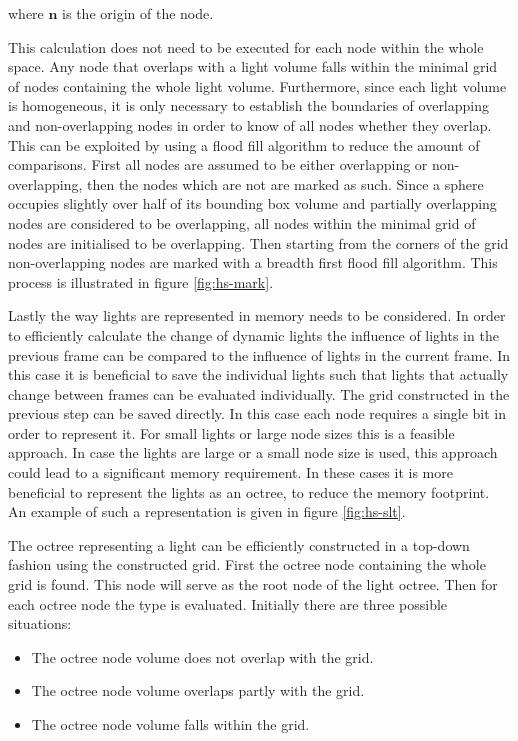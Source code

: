 \noindent where $\mathbf{n}$ is the origin of the node.

This calculation does not need to be executed for each node within the whole space. Any node that
overlaps with a light volume falls within the minimal grid of nodes containing the whole light
volume. Furthermore, since each light volume is homogeneous, it is only necessary to establish the boundaries
of overlapping and non-overlapping nodes in order to know of all nodes whether they overlap.
This can be exploited by using a flood fill algorithm to reduce the amount of comparisons.
First all nodes are assumed to be either overlapping or non-overlapping, then the nodes which
are not are marked as such. Since a sphere occupies slightly over half of its bounding box
volume and partially overlapping nodes are considered to be overlapping, all nodes within
the minimal grid of nodes are initialised to be overlapping. Then starting from the corners
of the grid non-overlapping nodes are marked with a breadth first flood fill algorithm.
This process is illustrated in figure \ref{fig:hs-mark}.



Lastly the way lights are represented in memory needs to be considered. In order to efficiently
calculate the change of dynamic lights the influence of lights in the previous frame can be compared
to the influence of lights in the current frame. In this case it is beneficial to save the
individual lights such that lights that actually change between frames can be evaluated
individually. The grid constructed in the previous step can be saved directly. In this case
each node requires a single bit in order to represent it. For small lights or large node sizes
this is a feasible approach. In case the lights are large or a small node size is used, this
approach could lead to a significant memory requirement. In these cases it is more beneficial
to represent the lights as an octree, to reduce the memory footprint. An example of such a
representation is given in figure \ref{fig:hs-slt}.

The octree representing a light can be efficiently constructed in a top-down fashion using the
constructed grid. First the octree node containing the whole grid is found. This node will
serve as the root node of the light octree. Then for each octree node the type is evaluated.
Initially there are three possible situations:

\begin{itemize}
  \item The octree node volume does not overlap with the grid.
  \item The octree node volume overlaps partly with the grid.
  \item The octree node volume falls within the grid.
\end{itemize}


